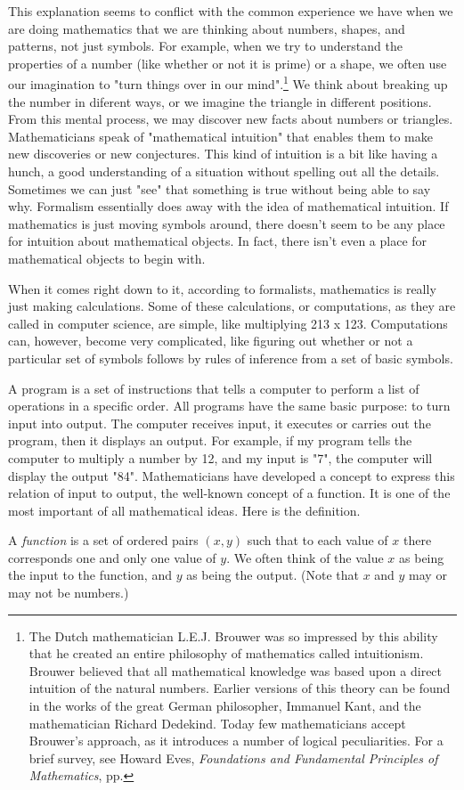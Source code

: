       This explanation seems to conflict with the common experience we have when we are doing mathematics that we are thinking about numbers, shapes, and patterns, not just symbols.  For example, when we try to understand the properties of a number (like whether or not it is prime) or a shape, we often use our imagination to "turn things over in our mind".\footnote{The Dutch mathematician L.E.J. Brouwer was so impressed by this ability that he created an entire philosophy of mathematics called intuitionism.  Brouwer believed that all mathematical knowledge was based upon a direct intuition of the natural numbers.  Earlier versions of this theory can be found in the works of the great German philosopher, Immanuel Kant, and the mathematician Richard Dedekind.  Today few mathematicians accept Brouwer's approach, as it introduces a number of logical peculiarities.  For a brief survey, see Howard Eves, \textit{Foundations and Fundamental Principles of Mathematics}, pp.}  We think about breaking up the number in diferent ways, or we imagine the triangle in different positions.  From this mental process, we may discover new facts about numbers or triangles.  Mathematicians speak of "mathematical intuition" that enables them to make new discoveries or new conjectures.  This kind of intuition is a bit like having a hunch, a good understanding of a situation without spelling out all the details.  Sometimes we can just "see" that something is true without being able to say why.   Formalism essentially does away with the idea of mathematical intuition.  If mathematics is just moving symbols around, there doesn't seem to be any place for intuition about mathematical objects.  In fact, there isn't even a place for mathematical objects to begin with.
        
     When it comes right down to it, according to formalists, mathematics is really just making calculations.  Some of these calculations, or computations, as they are called in computer science, are simple, like multiplying 213 x 123.  Computations can, however, become very complicated, like figuring out whether or not a particular set of symbols follows by rules of inference from a set of basic symbols.
       
A program is a set of instructions that tells a computer to perform a list of operations in a specific order.  All programs have the same basic purpose: to turn input into output.  The computer receives input, it executes or carries out the program, then it displays an output.  For example, if my program tells the computer to multiply a number by 12, and my input is "7", the computer will display the output "84".  Mathematicians have developed a concept to express this relation of input to output, the well-known concept of a function. It is one of the most important of all mathematical ideas.  Here is the definition.
\begin{dfn}
A \emph{function} is a set of ordered pairs $(x,y)$ such that to each value of $x$ there corresponds one and only one value of $y$.  We often think of the value $x$ as being the input to the function, and $y$ as being the output.  (Note that $x$ and $y$ may or may not be numbers.)
\end{dfn}

